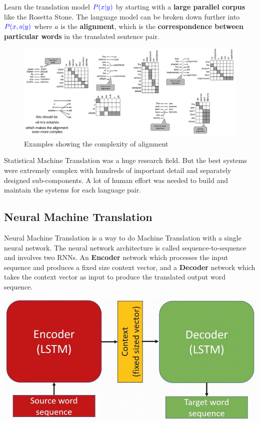 \documentclass[11pt]{article}
\begin{document}
Learn the translation model ${\color{blue} P(x|y)}$ by starting with a \textbf{large parallel corpus} like the Rosetta Stone. The language model can be broken down further into ${\color{blue} P(x,a|y)}$ where $a$ is the \textbf{alignment}, which is the \textbf{correspondence between particular words} in the translated sentence pair.

\begin{figure}[H]
	\centering
	\includegraphics[width=\linewidth]{img/alignment_complex}
	\caption{Examples showing the complexity of alignment}
	\label{fig:alignmentcomplex}
\end{figure}

Statistical Machine Translation was a huge research field. But the best systems were extremely complex with hundreds of important detail and separately designed sub-components. A lot of human effort was needed to build and maintain the systems for each language pair.

\clearpage
\subsection{Neural Machine Translation}
Neural Machine Translation is a way to do Machine Translation with a single neural network. The neural network architecture is called sequence-to-sequence and involves two RNNs. An {\color{red} \textbf{Encoder}} network which processes the input sequence and produces a fixed size {\color{Goldenrod2} context vector}, and a {\color{Green3} \textbf{Decoder}} network which takes the context vector as input to produce the translated output word sequence.

\begin{center}
	\includegraphics[width=0.6\linewidth]{img/encoder_decoder_machine_translation}
\end{center}
\end{document}
